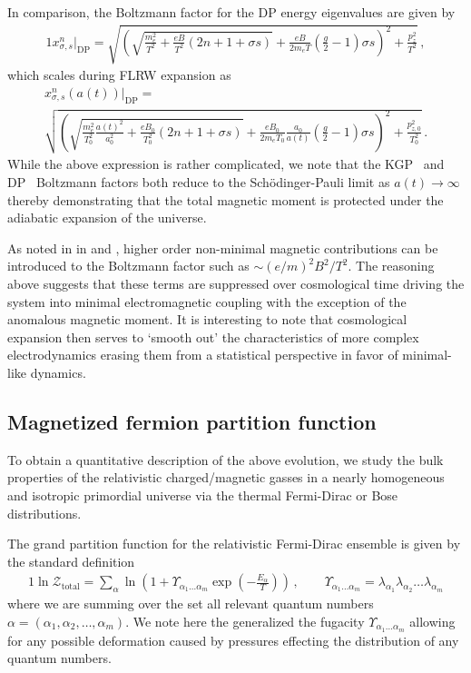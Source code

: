 In comparison, the Boltzmann factor for the DP energy eigenvalues are given by
\begin{alignat}{1}
    \label{xscaledp:1} x_{\sigma,s}^{n}\vert_\mathrm{DP} = \sqrt{\left(\sqrt{\frac{m_{e}^{2}}{T^{2}}+\frac{eB}{T^{2}}\left(2n+1+\sigma s\right)}+\frac{eB}{2m_{e}T}\left(\frac{g}{2}-1\right)\sigma s\right)^{2}+\frac{p_{z}^{2}}{T^{2}}}\,,
\end{alignat}
which scales during FLRW expansion as
\begin{multline}
    \label{xscaledp:2} x_{\sigma,s}^{n}(a(t))\vert_\mathrm{DP} =\\ \sqrt{\left(\sqrt{\frac{m_{e}^{2}}{T_{0}^{2}}\frac{a(t)^{2}}{a_{0}^{2}}+\frac{eB_{0}}{T_{0}^{2}}\left(2n+1+\sigma s\right)}+\frac{eB_{0}}{2m_{e}T_{0}}\frac{a_{0}}{a(t)}\left(\frac{g}{2}-1\right)\sigma s\right)^{2}+\frac{p_{z,0}^{2}}{T_{0}^{2}}}\,.
\end{multline}
While the above expression is rather complicated, we note that the KGP~ and DP~ Boltzmann factors both reduce to the Sch{\"o}dinger-Pauli limit as $a(t)\rightarrow\infty$ thereby demonstrating that the total magnetic moment is protected under the adiabatic expansion of the universe.

As noted in in  and , higher order non-minimal magnetic contributions can be introduced to the Boltzmann factor such as $\sim(e/m)^{2}B^{2}/T^{2}$. The reasoning above suggests that these terms are suppressed over cosmological time driving the system into minimal electromagnetic coupling with the exception of the anomalous magnetic moment. It is interesting to note that cosmological expansion then serves to `smooth out' the characteristics of more complex electrodynamics erasing them from a statistical perspective in favor of minimal-like dynamics.

\subsection{Magnetized fermion partition function}
\label{sec:partition}
\noindent To obtain a quantitative description of the above evolution, we study the bulk properties of the relativistic charged/magnetic gasses in a nearly homogeneous and isotropic primordial universe via the thermal Fermi-Dirac or Bose distributions.

The grand partition function for the relativistic Fermi-Dirac ensemble is given by the standard definition
\begin{alignat}{1}
    \label{part:1} \ln\mathcal{Z}_\mathrm{total}=\sum_{\alpha}\ln\left(1+\Upsilon_{\alpha_{1}\ldots\alpha_{m}}\exp\left(-\frac{E_{\alpha}}{T}\right)\right)\,,\qquad\Upsilon_{\alpha_{1}\ldots\alpha_{m}}=\lambda_{\alpha_{1}}\lambda_{\alpha_{2}}\ldots\lambda_{\alpha_{m}}
\end{alignat}
where we are summing over the set all relevant quantum numbers $\alpha=(\alpha_{1},\alpha_{2},\ldots,\alpha_{m})$. We note here the generalized the fugacity $\Upsilon_{\alpha_{1}\ldots\alpha_{m}}$ allowing for any possible deformation caused by pressures effecting the distribution of any quantum numbers.

